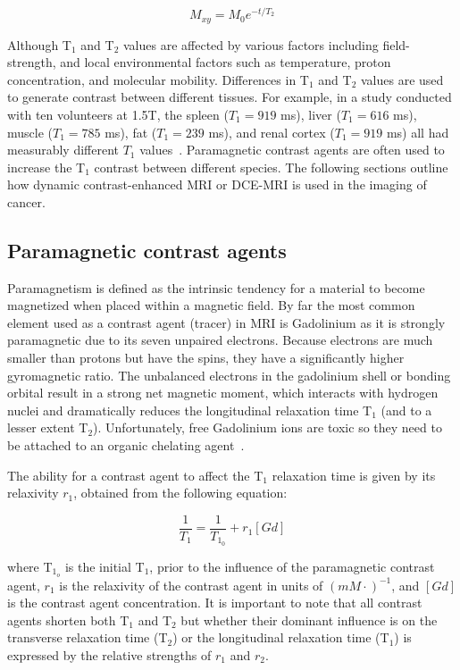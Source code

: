\begin{equation}
		M_{xy} = M_0 e^{-t/T_2}
		\label{T2}
\end{equation}

Although T$_1$ and T$_2$ values are affected by various factors including field-strength, and local environmental factors such as temperature, proton concentration, and molecular mobility. 
Differences in T$_1$ and T$_2$ values are used to generate contrast between different tissues. 
For example, in a study conducted with ten volunteers at 1.5T, the spleen ($T_1 = 919$ ms), liver ($T_1 = 616$ ms), muscle ($T_1 = 785$ ms), fat ($T_1 = 239$ ms), and renal cortex ($T_1 = 919$ ms) all had measurably different $T_1$ values~\cite{OConnor:2009ku}.
Paramagnetic contrast agents are often used to increase the T$_1$ contrast between different species. 
The following sections outline how dynamic contrast-enhanced MRI or \acs{DCE-MRI} is used in the imaging of cancer.

\subsection{Paramagnetic contrast agents}

Paramagnetism is defined as the intrinsic tendency for a material to become magnetized when placed within a magnetic field.
By far the most common element used as a contrast agent (tracer) in MRI is Gadolinium as it is strongly paramagnetic due to its seven unpaired electrons.
Because electrons are much smaller than protons but have the spins, they have a significantly higher gyromagnetic ratio.
The unbalanced electrons in the gadolinium shell or bonding orbital result in a strong net magnetic moment, which interacts with hydrogen nuclei and dramatically reduces the longitudinal relaxation time T$_1$ (and to a lesser extent T$_2$).
Unfortunately, free Gadolinium ions are toxic so they need to be attached to an organic chelating agent~\cite{DeLeonRodriguez:2015bl}.

The ability for a contrast agent to affect the T$_1$ relaxation time is given by its relaxivity $r_1$, obtained from the following equation:

\begin{equation}
\frac{1}{T_{1}} = \frac{1}{T_{1_0}} + r_1 [Gd]
\end{equation}

where T$_{1_o}$ is the initial T$_1$, prior to the influence of the paramagnetic contrast agent, $r_1$ is the relaxivity of the contrast agent in units of $(mM\cdot)^{-1}$, and $[Gd]$ is the contrast agent concentration.
It is important to note that all contrast agents shorten both T$_1$ and T$_2$ but whether their dominant influence is on the transverse relaxation time (T$_2$) or the longitudinal relaxation time (T$_1$) is expressed by the relative strengths of $r_1$ and $r_2$.

